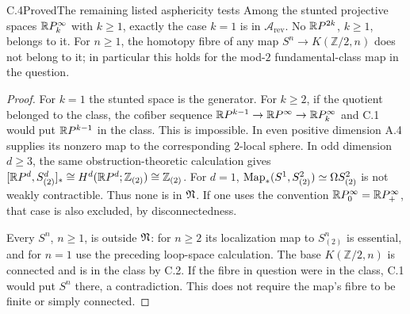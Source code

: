 \begin{claim}{C.4}{Proved}{The remaining listed asphericity tests}
Among the stunted projective spaces $\mathbb{R}P^\infty_k$ with $k\geq1$, exactly the case $k=1$ is in $\mathcal A_{\mathrm{rev}}$. No $\mathbb{R}P^{2k}$, $k\geq1$, belongs to it. For $n\geq1$, the homotopy fibre of any map $S^n\to K(\mathbb Z/2,n)$ does not belong to it; in particular this holds for the mod-$2$ fundamental-class map in the question.
\end{claim}
\begin{proof}
For $k=1$ the stunted space is the generator. For $k\geq2$, if the quotient belonged to the class, the cofiber sequence
$\mathbb{R}P^{k-1}\to\mathbb{R}P^\infty\to\mathbb{R}P^\infty_k$
and C.1 would put $\mathbb{R}P^{k-1}$ in the class. This is impossible. In even positive dimension A.4 supplies its nonzero map to the corresponding $2$-local sphere. In odd dimension $d\geq3$, the same obstruction-theoretic calculation gives
$[\mathbb{R}P^d,S^d_{(2)}]_*\cong H^d(\mathbb{R}P^d;\mathbb Z_{(2)})\cong\mathbb Z_{(2)}$.
For $d=1$, $\operatorname{Map}_*(S^1,S^2_{(2)})\simeq\Omega S^2_{(2)}$ is not weakly contractible. Thus none is in $\mathfrak N$. If one uses the convention $\mathbb{R}P^\infty_0=\mathbb{R}P^\infty_+$, that case is also excluded, by disconnectedness.

Every $S^n$, $n\geq1$, is outside $\mathfrak N$: for $n\geq2$ its localization map to $S^n_{(2)}$ is essential, and for $n=1$ use the preceding loop-space calculation. The base $K(\mathbb Z/2,n)$ is connected and is in the class by C.2. If the fibre in question were in the class, C.1 would put $S^n$ there, a contradiction. This does not require the map's fibre to be finite or simply connected.
\end{proof}

